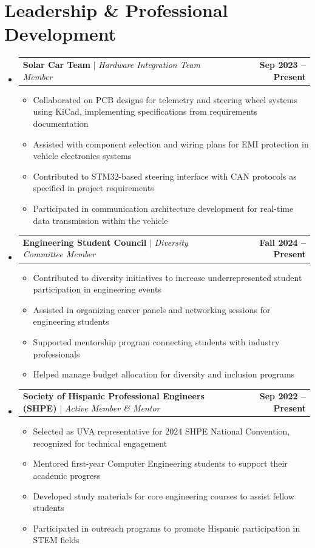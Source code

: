 \documentclass[letterpaper,11pt]{article}
\makeatletter
\newcommand{\resumeItem}[1]{
  \item\small{
    {#1 \vspace{-2pt}}
  }
}
\newcommand{\resumeProjectHeading}[2]{
    \item
    \begin{tabular*}{0.99\textwidth}{l@{\extracolsep{\fill}}r}
      \small#1 & \textbf{\small #2}\\
    \end{tabular*}\vspace{-5pt}
}
\newcommand{\resumeSubHeadingListStart}{\begin{itemize}[leftmargin=0.0in, label={}]}
\newcommand{\resumeSubHeadingListEnd}{\end{itemize}}
\newcommand{\resumeItemListStart}{\begin{itemize}}
\newcommand{\resumeItemListEnd}{\end{itemize}\vspace{-3pt}}
\makeatother
\begin{document}
\section{Leadership \& Professional Development}
    \resumeSubHeadingListStart
        \resumeProjectHeading
            {\textbf{Solar Car Team} $|$ \emph{Hardware Integration Team Member}}{Sep 2023 -- Present}
            \resumeItemListStart
                \resumeItem{Collaborated on PCB designs for telemetry and steering wheel systems using KiCad, implementing specifications from requirements documentation}
                \resumeItem{Assisted with component selection and wiring plans for EMI protection in vehicle electronics systems}
                \resumeItem{Contributed to STM32-based steering interface with CAN protocols as specified in project requirements}
                \resumeItem{Participated in communication architecture development for real-time data transmission within the vehicle}
            \resumeItemListEnd
            \vspace{-12pt}
        \resumeProjectHeading
            {\textbf{Engineering Student Council} $|$ \emph{Diversity Committee Member}}{Fall 2024 -- Present}
            \resumeItemListStart
                \resumeItem{Contributed to diversity initiatives to increase underrepresented student participation in engineering events}
                \resumeItem{Assisted in organizing career panels and networking sessions for engineering students}
                \resumeItem{Supported mentorship program connecting students with industry professionals}
                \resumeItem{Helped manage budget allocation for diversity and inclusion programs}
            \resumeItemListEnd
            \vspace{-12pt}
        \resumeProjectHeading
            {\textbf{Society of Hispanic Professional Engineers (SHPE)} $|$ \emph{Active Member \& Mentor}}{Sep 2022 -- Present}
            \resumeItemListStart
                \resumeItem{Selected as UVA representative for 2024 SHPE National Convention, recognized for technical engagement}
                \resumeItem{Mentored first-year Computer Engineering students to support their academic progress}
                \resumeItem{Developed study materials for core engineering courses to assist fellow students}
                \resumeItem{Participated in outreach programs to promote Hispanic participation in STEM fields}
            \resumeItemListEnd
    \resumeSubHeadingListEnd
\end{document}
